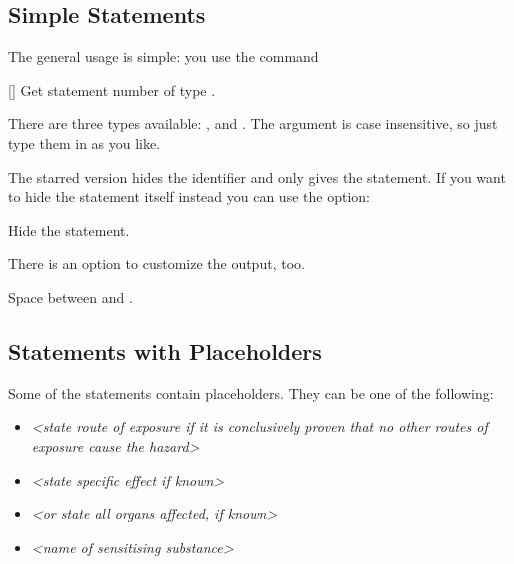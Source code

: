 \documentclass{ghsystem-manual}
\begin{document}
\subsection{Simple Statements}
The general usage is simple: you use the command
\begin{commands}
  [\sarg{}]
    Get statement number  of type .
\end{commands}
There are three types available: ,  and .  The
 argument is case insensitive, so just type them in as you like.
\begin{example}
   \par
   \par
   \par
   \par
\end{example}

The starred version hides the identifier and only gives the statement.  If you
want to hide the statement itself instead you can use the option:
\begin{options}
    Hide the statement.
\end{options}

There is an option to customize the output, too.
\begin{options}
  \Default
    Space between  and .
\end{options}
\begin{example}
   \par
   \par
   \par
\end{example}

\subsection{Statements with Placeholders}
Some of the statements contain placeholders.  They can be one of the
following:
\begin{itemize}
  \item \textit{\textless state route of exposure if it is conclusively proven
      that no other routes of exposure cause the hazard\textgreater}
  \item \textit{\textless state specific effect if known\textgreater}
  \item \textit{\textless or state all organs affected, if known\textgreater}
  \item \textit{\textless name of sensitising substance\textgreater}
\end{itemize}
\end{document}
